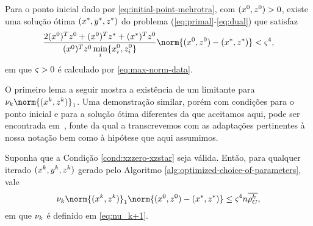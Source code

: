 \begin{cond} \label{cond:xzzero-xzstar} Para o ponto inicial dado por \eqref{eq:initial-point-mehrotra}, com $(x^0,z^0)>0$,  existe uma solução ótima $(x^*,y^*,z^*)$  do problema (\ref{eq:primal}-\ref{eq:dual}) que satisfaz 
\begin{equation}
	 	\label{eq:cond:xzzero-xzstar}
	 		\dfrac{2(\xzero)^T\zzero  + (\xzero)^T\zstar + (\xstar)^T\zzero}{(\xzero)^T\zzero \minxzinit} \norm{(\xzero,\zzero) - (\xstar,\zstar)} < \bdxzstar^{4},
\end{equation}
em que  $\varsigma>0$ é calculado por \eqref{eq:max-norm-data}. 
\end{cond}








O primeiro lema a seguir mostra a existência de um limitante para $\nuk \norm{(\xk,\zk)}_{1}$. Uma demonstração similar, porém com condições para o ponto inicial e para a solução ótima diferentes da que aceitamos aqui, pode ser encontrada em~\cite[Lema 6.1]{Wright:Primal-dual-interior-point:1997h}, fonte da qual a transcrevemos com as adaptações pertinentes à nossa notação bem como à hipótese que aqui assumimos.




\begin{lema}\label{lemma:boundxz1}
	Suponha que  a Condição \ref{cond:xzzero-xzstar} seja válida. Então, para qualquer iterado $(x^{k},y^{k},z^{k})$ gerado pelo Algoritmo \ref{alg:optimized-choice-of-parameters}, vale
	\begin{equation}
		\label{eq:bound-xkzk}
		\nuk \norm{(\xk,\zk)}_{1} \norm{(\xzero,\zzero) - (\xstar,\zstar)} \leq \bdxzstar^{4} n \rhoCkb ,
	\end{equation}
	em que $\nu_{k} $ é definido em \eqref{eq:nu_k+1}.
\end{lema}

